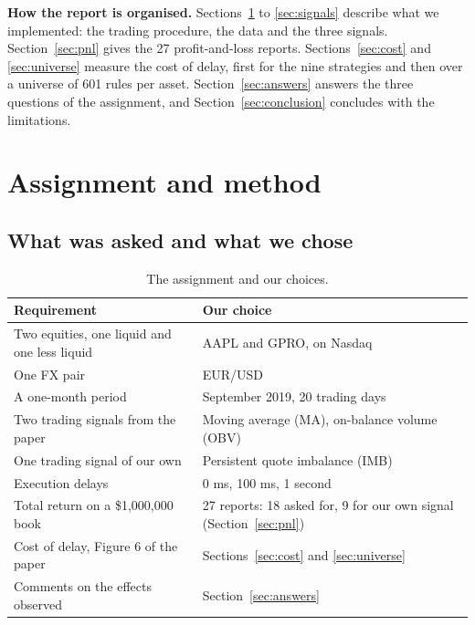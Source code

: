 \documentclass[11pt]{article}
\begin{document}
\textbf{How the report is organised.} Sections~\ref{sec:method} to
\ref{sec:signals} describe what we implemented: the trading procedure, the data and
the three signals. Section~\ref{sec:pnl} gives the 27 profit-and-loss reports.
Sections~\ref{sec:cost} and \ref{sec:universe} measure the cost of delay, first for
the nine strategies and then over a universe of 601 rules per asset.
Section~\ref{sec:answers} answers the three questions of the assignment, and
Section~\ref{sec:conclusion} concludes with the limitations.

\section{Assignment and method}
\label{sec:method}

\subsection{What was asked and what we chose}

\begin{table}[H]
  \centering
  \small
  \caption{The assignment and our choices.}
  \label{tab:choices}
  \begin{tabular}{@{}L{0.42\textwidth}L{0.50\textwidth}@{}}
    \toprule
    Requirement & Our choice \\
    \midrule
    Two equities, one liquid and one less liquid & AAPL and GPRO, on Nasdaq \\
    One FX pair & EUR/USD \\
    A one-month period & September 2019, 20 trading days \\
    Two trading signals from the paper & Moving average (MA), on-balance volume (OBV) \\
    One trading signal of our own & Persistent quote imbalance (IMB) \\
    Execution delays & 0 ms, 100 ms, 1 second \\
    Total return on a \$1{,}000{,}000 book & 27 reports: 18 asked for, 9 for our own signal (Section~\ref{sec:pnl}) \\
    Cost of delay, Figure 6 of the paper & Sections~\ref{sec:cost} and \ref{sec:universe} \\
    Comments on the effects observed & Section~\ref{sec:answers} \\
    \bottomrule
  \end{tabular}
\end{table}
\end{document}

